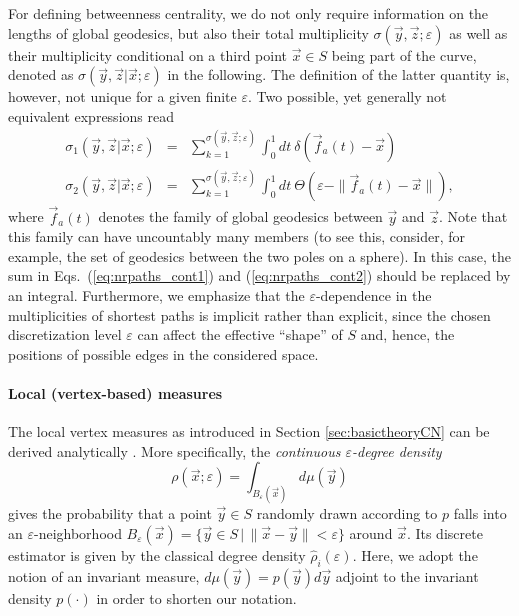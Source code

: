 		For defining betweenness centrality, we do not only require information on the lengths of global geodesics, but also their total multiplicity $\sigma(\vec{y},\vec{z};\varepsilon)$ as well as their multiplicity conditional on a third point $\vec{x}\in S$ being part of the curve, denoted as $\sigma(\vec{y},\vec{z}|\vec{x};\varepsilon)$ in the following. The definition of the latter quantity is, however, not unique for a given finite $\varepsilon$. Two possible, yet generally not equivalent expressions read~\cite{Donges2012}
\begin{eqnarray}
\sigma_1(\vec{y},\vec{z}|\vec{x};\varepsilon) &=& \sum_{k=1}^{\sigma(\vec{y},\vec{z};\varepsilon)} \int_0^1 dt\ \delta(\vec{f}_a(t)-\vec{x}) \label{eq:nrpaths_cont1} \\
\sigma_2(\vec{y},\vec{z}|\vec{x};\varepsilon) &=& \sum_{k=1}^{\sigma(\vec{y},\vec{z};\varepsilon)} \int_0^1 dt\ \Theta(\varepsilon-\|\vec{f}_a(t)-\vec{x}\|), \label{eq:nrpaths_cont2}
\end{eqnarray}
\noindent
where $\vec{f}_a(t)$ denotes the family of global geodesics between $\vec{y}$ and $\vec{z}$. Note that this family can have uncountably many members (to see this, consider, for example, the set of geodesics between the two poles on a sphere). In this case, the sum in Eqs.~(\ref{eq:nrpaths_cont1}) and (\ref{eq:nrpaths_cont2}) should be replaced by an integral. Furthermore, we emphasize that the $\varepsilon$-dependence in the multiplicities of shortest paths is implicit rather than explicit, since the chosen discretization level $\varepsilon$ can affect the effective ``shape'' of $S$ and, hence, the positions of possible edges in the considered space.


		\paragraph{Local (vertex-based) measures}
		The local vertex measures as introduced in Section \ref{sec:basictheoryCN} can be derived analytically \cite{Donges2012}. More specifically, the \emph{continuous $\varepsilon$-degree density}
\begin{equation} \label{eq:rhoAN}
\rho(\vec{x};\varepsilon)=\int_{B_{\varepsilon}(\vec{x})} d\mu(\vec{y})
\end{equation}
\noindent
gives the probability that a point $\vec{y}\in S$ randomly drawn according to $p$ falls into an $\varepsilon$-neighborhood $B_{\varepsilon}(\vec{x})=\{\vec{y}\in S\,|\, \|\vec{x}-\vec{y}\|<\varepsilon\}$ around $\vec{x}$. Its discrete estimator is given by the classical degree density $\hat{\rho}_i(\varepsilon)$. Here, we adopt the notion of an invariant measure, $d\mu(\vec{y})=p(\vec{y})d\vec{y}$ adjoint to the invariant density $p(\cdot)$ in order to shorten our notation.

